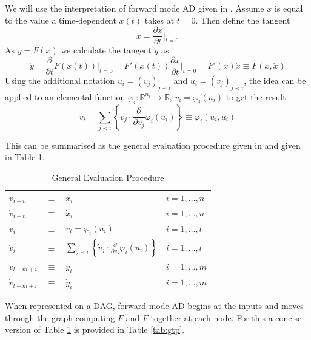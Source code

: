 \documentclass{article}
\begin{document}
We will use the interpretation of forward mode AD given in \cite{dhamarticle}. Assume $x$ is equal to the value a time-dependent $x(t)$ takes at $t=0$. Then define the tangent 
\begin{equation*}
    \dot{x} = \frac{\partial x}{\partial t} \Big|_{t=0}
\end{equation*}
As $y = F(x)$ we calculate the tangent $\dot{y}$ as
\begin{equation*}
    \Dot{y} = \frac{\partial}{\partial t} F(x (t)) \Big|_{t=0} 
    = F'(x (t)) \frac{\partial x}{\partial t} \Big|_{t=0}
    = F'(x) \Dot{x}
    \equiv \Dot{F}(x, \Dot{x})
\end{equation*}
Using the additional notation $u_i = (v_j)_{j \prec i}$ and $\Dot{u}_i = (\Dot{v}_j)_{j \prec i}$, the idea can be applied to an elemental function $\varphi_i : \mathbb{R}^{n_i} \longrightarrow \mathbb{R}$, $v_i = \varphi_i (u_i)$ to get the result
\begin{equation*}
    \label{tangentequ}
    \Dot{v_i} = \sum_{j \prec i} \left\{ \Dot{v}_j \cdot \frac{\partial}{\partial v_j} \varphi_i (u_i) \right\} 
    \equiv \Dot{\varphi}_i(u_i, \Dot{u}_i)
\end{equation*}

This can be summarised as the general evaluation procedure given in \cite{evald} and given in Table \ref{tab:gep}.

\begin{table}[h]
    \centering
    \begin{tabular}{|lcll|}
        \hline
        $v_{i-n}$ & $\equiv$ & $x_i$ & $i = 1, \ldots, n$ \\
        $\Dot{v}_{i-n}$ & $\equiv$ & $\Dot{x}_i$ & $i = 1, \ldots, n$ \\
        \hline
        $v_{i}$ & $\equiv$ & $v_i = \varphi_i (u_i)$ & $i = 1, \ldots, l$ \\
        $\Dot{v}_{i}$ & $\equiv$ & $\sum_{j \prec i} \left\{ \Dot{v}_j \cdot \frac{\partial}{\partial v_j} \varphi_i (u_i) \right\}$ & $i = 1, \ldots, l$ \\
        \hline
        $v_{l-m+i}$ & $\equiv$ & $y_i$ & $i = 1, \ldots, m$ \\
        $\Dot{v}_{l-m+i}$ & $\equiv$ & $\Dot{y}_i$ & $i = 1, \ldots, m$ \\
        \hline
    \end{tabular}
    \caption{General Evaluation Procedure}
    \label{tab:gep}
\end{table}

When represented on a DAG, forward mode AD begins at the inputs and moves through the graph computing $F$ and $\Dot{F}$ together at each node. For this a concise version of Table \ref{tab:gep} is provided in Table \ref{tab:gtp}.
\end{document}
